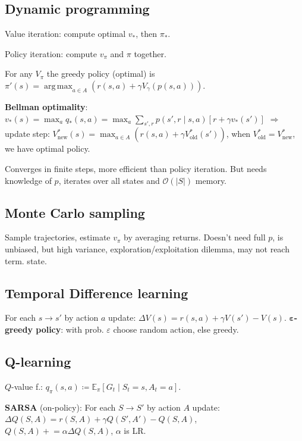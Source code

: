 \documentclass[11pt,landscape,a4paper,fleqn]{article}
\newcommand{\E}{\mathbb{E}}
\DeclareMathOperator*{\argmax}{arg\,max}
\begin{document}
\begin{multicols*}{4}
\subsection{Dynamic programming}

Value iteration: compute optimal $v_*$, then $\pi_*$.

Policy iteration: compute $v_\pi$ and $\pi$ together.

For any $V_\pi$ the greedy policy (optimal) is
$\pi'(s) = \argmax_{a \in A}(r(s, a) + \gamma V_\gamma(p(s, a)))$.

\textbf{Bellman optimality}: $v_*(s) = \max_a q_*(s, a)
= \max_a \sum_{s', r} p(s', r \mid s, a)[r + \gamma v_*(s')]$
$ \Rightarrow $ update step:
$V_{\mathrm{new}}^*(s) = \max_{a \in A} (r(s, a) + \gamma V_{\mathrm{old}}^*(s'))$,
when $V_{\mathrm{old}}^* = V_{\mathrm{new}}^*$, we have optimal policy.

Converges in finite steps, more efficient than policy iteration.
But needs knowledge of $p$,
iterates over all states and $\mathcal{O}(|S|)$ memory.

\subsection{Monte Carlo sampling}

Sample trajectories, estimate $v_\pi$ by averaging returns.
Doesn't need full $p$, is unbiased,
but high variance, exploration/exploitation dilemma, may not reach term. state.

\subsection{Temporal Difference learning}

For each $s \to s'$ by action $a$ update:
$\Delta V(s) = r(s, a) + \gamma V(s') - V(s)$.
\textbf{$\bm\varepsilon$-greedy policy}: with prob. $\varepsilon$ choose random action, else greedy.

\subsection{Q-learning}

$Q$-value f.: $q_\pi(s, a) \coloneqq \E_\pi[G_t \mid S_t = s, A_t = a]$.

\textbf{SARSA} (on-policy):
For each $S \to S'$ by action $A$ update:
$\Delta Q(S, A) = r(S, A) + \gamma Q(S', A') - Q(S, A)$,
$Q(S, A) {}+{}\!\!\!= \alpha \Delta Q(S, A)$,
$\alpha$ is LR.


\end{multicols*}
\end{document}
